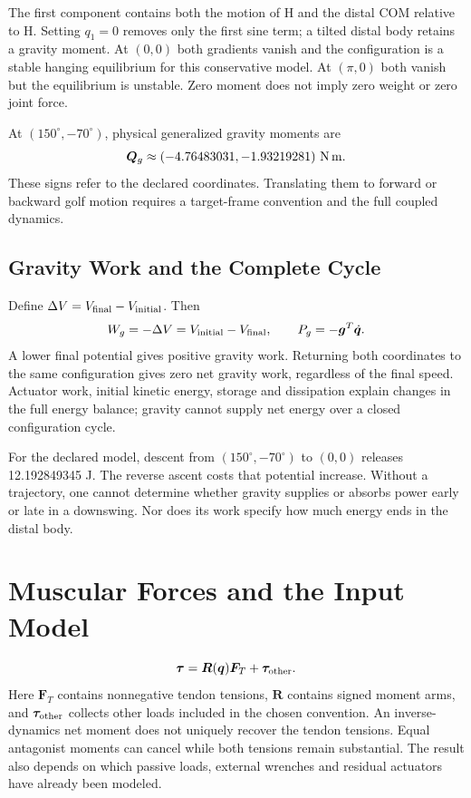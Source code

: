 The first component contains both the motion of H and the distal COM relative to H. Setting \(q_1=0\) removes only the first sine term; a tilted distal body retains a gravity moment. At \((0,0)\) both gradients vanish and the configuration is a stable hanging equilibrium for this conservative model. At \((\pi,0)\) both vanish but the equilibrium is unstable. Zero moment does not imply zero weight or zero joint force.

At \((150^\circ,-70^\circ)\), physical generalized gravity moments are
\[
\bm Q_g\approx(-4.76483031,-1.93219281)\ {\rm N\,m}.
\]
These signs refer to the declared coordinates. Translating them to forward or backward golf motion requires a target-frame convention and the full coupled dynamics.

\subsection*{Gravity Work and the Complete Cycle}

Define \(\Delta V=V_{\rm final}-V_{\rm initial}\). Then
\begin{equation}
W_g=-\Delta V=V_{\rm initial}-V_{\rm final},\qquad
P_g=-\bm g^T\dot{\bm q}.
\label{eq:ch04_work_gravity}
\end{equation}
A lower final potential gives positive gravity work. Returning both coordinates to the same configuration gives zero net gravity work, regardless of the final speed. Actuator work, initial kinetic energy, storage and dissipation explain changes in the full energy balance; gravity cannot supply net energy over a closed configuration cycle.

For the declared model, descent from \((150^\circ,-70^\circ)\) to \((0,0)\) releases 12.192849345 J. The reverse ascent costs that potential increase. Without a trajectory, one cannot determine whether gravity supplies or absorbs power early or late in a downswing. Nor does its work specify how much energy ends in the distal body.

\section{Muscular Forces and the Input Model}

\begin{equation}
\bm\tau=\bm R(\bm q)\bm F_T+\bm\tau_{\rm other}.
\label{eq:ch04_tau_def}
\end{equation}
Here \(\bm F_T\) contains nonnegative tendon tensions, \(\bm R\) contains signed moment arms, and \(\bm\tau_{\rm other}\) collects other loads included in the chosen convention. An inverse-dynamics net moment does not uniquely recover the tendon tensions. Equal antagonist moments can cancel while both tensions remain substantial. The result also depends on which passive loads, external wrenches and residual actuators have already been modeled.

